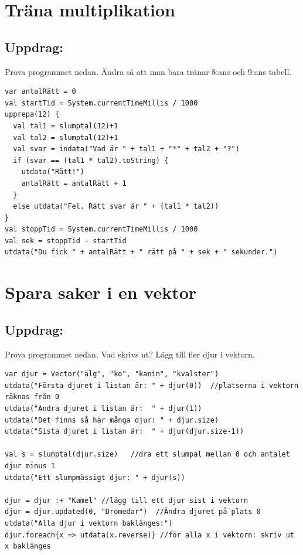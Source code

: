 \chapter{Träna multiplikation}\section*{\color{BrickRed}Uppdrag:}
Prova programmet nedan. Ändra så att man bara tränar 8:ans och 9:ans tabell.

\begin{lstlisting}[basicstyle={\ttfamily\fontsize{16}{19}\selectfont},numbers=none]
var antalRätt = 0
val startTid = System.currentTimeMillis / 1000
upprepa(12) {
  val tal1 = slumptal(12)+1
  val tal2 = slumptal(12)+1
  val svar = indata("Vad är " + tal1 + "*" + tal2 + "?")
  if (svar == (tal1 * tal2).toString) {
    utdata("Rätt!")
    antalRätt = antalRätt + 1
  }
  else utdata("Fel. Rätt svar är " + (tal1 * tal2))
}
val stoppTid = System.currentTimeMillis / 1000
val sek = stoppTid - startTid
utdata("Du fick " + antalRätt + " rätt på " + sek + " sekunder.")
\end{lstlisting}
        
\chapter{Spara saker i en vektor}\section*{\color{BrickRed}Uppdrag:}
Prova programmet nedan. Vad skrivs ut? Lägg till fler djur i vektorn.

\begin{lstlisting}[basicstyle={\ttfamily\fontsize{16}{19}\selectfont},numbers=none]
var djur = Vector("älg", "ko", "kanin", "kvalster")
utdata("Första djuret i listan är: " + djur(0))  //platserna i vektorn räknas från 0
utdata("Andra djuret i listan är:  " + djur(1))
utdata("Det finns så här många djur: " + djur.size)
utdata("Sista djuret i listan är:  " + djur(djur.size-1))

val s = slumptal(djur.size)   //dra ett slumpal mellan 0 och antalet djur minus 1
utdata("Ett slumpmässigt djur: " + djur(s))

djur = djur :+ "Kamel" //lägg till ett djur sist i vektorn
djur = djur.updated(0, "Dromedar")  //Ändra djuret på plats 0
utdata("Alla djur i vektorn baklänges:")
djur.foreach{x => utdata(x.reverse)} //för alla x i vektorn: skriv ut x baklänges
\end{lstlisting}
        
